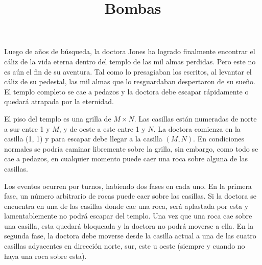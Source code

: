 \documentclass{oci}
\title{Bombas}
\begin{document}
\begin{problemDescription}
  Luego de años de búsqueda, la doctora Jones ha logrado finalmente encontrar el cáliz de la vida
  eterna dentro del templo de las mil almas perdidas.
  Pero este no es aún el fin de su aventura.
  Tal como lo presagiaban los escritos, al levantar el cáliz de su pedestal, las mil almas que lo
  resguardaban despertaron de su sueño.
  El templo completo se cae a pedazos y la doctora debe escapar rápidamente o quedará atrapada por
  la eternidad.

  El piso del templo es una grilla de $M\times N$.
  Las casillas están numeradas de norte a sur entre 1 y $M$, y de oeste a este entre 1 y $N$.
  La doctora comienza en la casilla (1, 1) y para escapar debe llegar a la casilla $(M, N)$.
  En condiciones normales se podría caminar libremente sobre la grilla, sin embargo, como todo se
  cae a pedazos, en cualquier momento puede caer una roca sobre alguna de las casillas.

  Los eventos ocurren por turnos, habiendo dos fases en cada uno.
  En la primera fase, un número arbitrario de rocas puede caer sobre las casillas.
  Si la doctora se encuentra en una de las casillas donde cae una roca, será aplastada por esta y
  lamentablemente no podrá escapar del templo.
  Una vez que una roca cae sobre una casilla, esta quedará bloqueada y la doctora no podrá moverse
  a ella.
  En la segunda fase, la doctora debe moverse desde la casilla actual a una de las cuatro casillas
  adyacentes en dirección norte, sur, este u oeste (siempre y cuando no haya una roca sobre esta).


\end{problemDescription}
\end{document}
